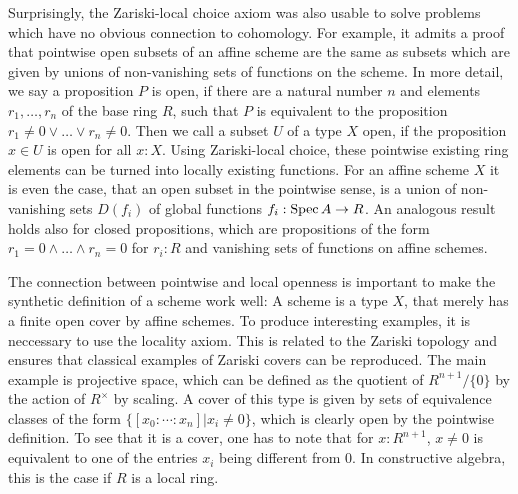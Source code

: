 Surprisingly, the Zariski-local choice axiom was also usable to solve problems which have no obvious connection to cohomology.
For example, it admits a proof that pointwise open subsets of an affine scheme are the same as subsets which are given by unions of non-vanishing sets of functions on the scheme.
In more detail, we say a proposition $P$ is open, if there are a natural number $n$ and elements $r_1,\dots,r_n$ of the base ring $R$,
such that $P$ is equivalent to the proposition $r_1\neq 0 \vee\dots\vee r_n\neq 0$.
Then we call a subset $U$ of a type $X$ open, if the proposition $x\in U$ is open for all $x:X$.
Using Zariski-local choice, these pointwise existing ring elements can be turned into locally existing functions.
For an affine scheme $X$ it is even the case, that an open subset in the pointwise sense, is a union of non-vanishing sets $D(f_i)$ of global functions $f_i:\operatorname{Spec} A \to R$.
An analogous result holds also for closed propositions, which are propositions of the form $r_1=0\wedge\dots\wedge r_n=0$ for $r_i:R$ and vanishing sets of functions on affine schemes.

The connection between pointwise and local openness is important to make the synthetic definition of a scheme work well:
A scheme is a type $X$, that merely has a finite open cover by affine schemes.
To produce interesting examples, it is neccessary to use the locality axiom.
This is related to the Zariski topology and ensures that classical examples of Zariski covers can be reproduced.
The main example is projective space, which can be defined as the quotient of $R^{n+1}/\{0\}$ by the action of $R^\times$ by scaling.
A cover of this type is given by sets of equivalence classes of the form $\{[x_0:\cdots:x_n] \vert x_i\neq 0 \}$, which is clearly open by the pointwise definition.
To see that it is a cover, one has to note that for $x:R^{n+1}$, $x\neq 0$ is equivalent to one of the entries $x_i$ being different from 0. In constructive algebra, this is the case if $R$ is a local ring.
